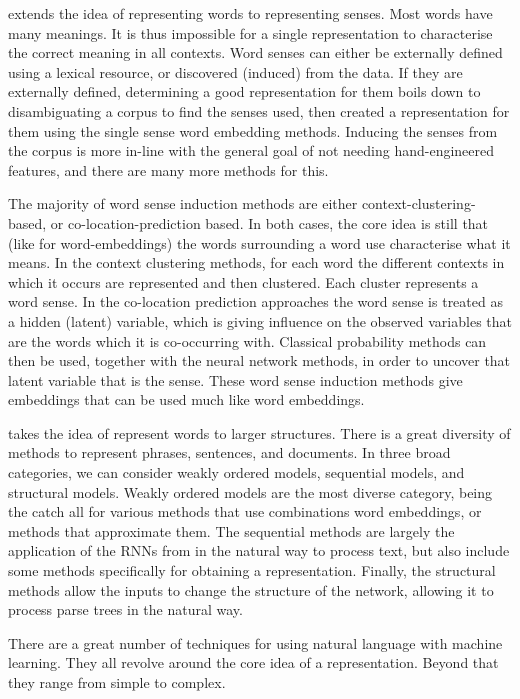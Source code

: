 \documentclass[12pt,parskip]{komatufte}
\begin{document}
 extends the idea of representing words to representing senses.
Most words have many meanings.
It is thus impossible for a single representation to characterise the correct meaning in all contexts.
Word senses can either be externally defined using a lexical resource,
or discovered (induced) from the data.
If they are externally defined, determining a good representation for them boils down to disambiguating a corpus to find the senses used, then created a representation for them using the single sense word embedding methods.
Inducing the senses from the corpus is more in-line with the general goal of not needing hand-engineered features, and there are many more methods for this.

The majority of word sense induction methods are either context-clustering-based, or co-location-prediction based.
In both cases, the core idea is still that (like for word-embeddings) the words surrounding a word use characterise what it means.
In the context clustering methods, for each word the different contexts in which it occurs are represented and then clustered.
Each cluster represents a word sense.
In the co-location prediction approaches the word sense is treated as a hidden (latent) variable,
which is giving influence on the observed variables that are the words which it is co-occurring with.
Classical probability methods can then be used, together with the neural network methods, in order to uncover that latent variable that is the sense.
These word sense induction methods give embeddings that can be used much like word embeddings.


 takes the idea of represent words to larger structures.
There is a great diversity of methods to represent phrases, sentences, and documents.
In three broad categories, we can consider weakly ordered models, sequential models, and structural models.
Weakly ordered models are the most diverse category, being the catch all for various methods that use combinations word embeddings, or methods that approximate them.
The sequential methods are largely the application of the RNNs from  in the natural way to process text,
but also include some methods specifically for obtaining a representation.
Finally, the structural methods allow the inputs to change the structure of the network,
allowing it to process parse trees in the natural way.



There are a great number of techniques for using natural language with machine learning.
They all revolve around the core idea of a representation.
Beyond that they range from simple to complex.
\end{document}
